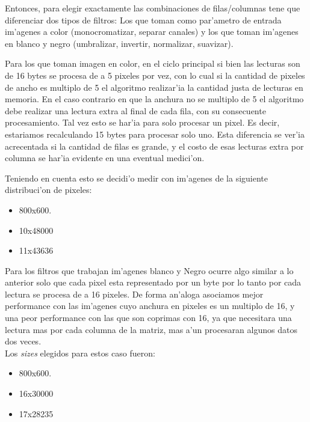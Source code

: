 Entonces, para elegir exactamente las combinaciones de filas/columnas tene que diferenciar dos tipos de
filtros: Los que toman como par'ametro de entrada im'agenes a color (monocromatizar, separar canales) y los que toman im'agenes en blanco y negro
(umbralizar, invertir, normalizar, suavizar).

Para los que toman imagen en color, en el ciclo principal si bien las lecturas son de 16 bytes se procesa de a 5 pixeles por vez, con lo cual si la cantidad de pixeles de ancho es multiplo de 5 el algoritmo realizar'ia la cantidad justa de lecturas en memoria. En el caso contrario en que la anchura no se multiplo de 5 el algoritmo debe realizar una lectura extra al final de cada fila, con su consecuente procesamiento. Tal vez esto se har'ia para solo procesar un pixel. Es decir, estariamos recalculando 15 bytes para procesar solo uno. Esta diferencia se ver'ia acrecentada si la cantidad de filas es grande, y el costo de esas lecturas extra por columna se har'ia evidente en una eventual medici'on.


Teniendo en cuenta esto se decidi'o medir con im'agenes de la siguiente distribuci'on de pixeles:
 \begin{itemize}
 \item{800x600}.
 \item{10x48000}
 \item{11x43636}
\end{itemize}
Para los filtros que trabajan im'agenes blanco y Negro ocurre algo similar a lo anterior solo que cada
pixel esta representado por un byte por lo tanto por cada lectura se procesa de a 16 pixeles. De forma
an'aloga asociamos mejor performance con las im'agenes cuyo anchura en pixeles es un multiplo de 16, y 
una peor performance con las que son coprimas con 16, ya que necesitara una lectura mas por cada columna
de la matriz, mas a'un procesaran algunos datos dos veces. \\
Los \textit{sizes} elegidos para estos caso fueron:\\
\begin{itemize}
 \item{800x600}.
 \item{16x30000}
 \item{17x28235}
\end{itemize}
